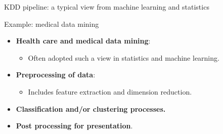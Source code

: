 \documentclass[aspectratio=169,t]{beamer}
\begin{document}
{\begin{frame}{KDD pipeline: a typical view from machine learning and statistics}
    \end{frame}
  }

  { 
    \begin{frame}{Example: medical data mining}
    \begin{itemize}
        \item \textbf{Health care and medical data mining}:
        \begin{itemize}
            \item Often adopted such a view in statistics and machine learning.
        \end{itemize}
        \item \textbf{Preprocessing of data}:
        \begin{itemize}
            \item Includes feature extraction and dimension reduction.
        \end{itemize}
        \item \textbf{Classification and/or clustering processes.}
        \item \textbf{Post processing for presentation}.
    \end{itemize}
    \end{frame}
  }
\end{document}
